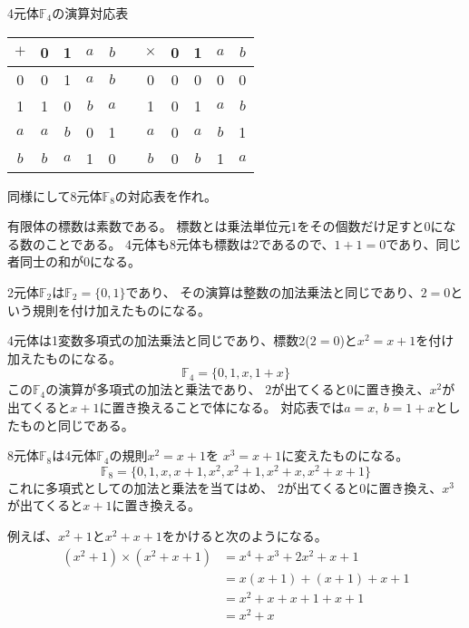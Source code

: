 \documentclass[12pt,b5paper]{ltjsarticle}
\begin{document}
\hrulefill

\begin{center}
 4元体$\mathbb{F}_4$の演算対応表

 \begin{tabular}{c||c|c|c|c||c||c||c|c|c|c}
  $+$ & 0 & 1 & $a$ & $b$ & & $\times$ & 0 & 1 & $a$ & $b$ \\
  \hline\hline
  0 & 0 & 1 & $a$ & $b$ & & 0 & 0 & 0 & 0 & 0 \\
  \hline
  1 & 1 & 0 & $b$ & $a$ & & 1 & 0 & 1 & $a$ & $b$ \\
  \hline
  $a$ & $a$ & $b$ & 0 & 1 & & $a$ & 0 & $a$ & $b$ & 1 \\
  \hline
  $b$ & $b$ & $a$ & 1 & 0 & & $b$ & 0 & $b$ & 1 & $a$ \\
 \end{tabular}
\end{center}

同様にして8元体$\mathbb{F}_8$の対応表を作れ。

\dotfill

有限体の標数は素数である。
標数とは乗法単位元$1$をその個数だけ足すと0になる数のことである。
4元体も8元体も標数は2であるので、$1+1=0$であり、同じ者同士の和が0になる。

2元体$\mathbb{F}_2$は$\mathbb{F}_2=\{0,1\}$であり、
その演算は整数の加法乗法と同じであり、$2=0$という規則を付け加えたものになる。

4元体は1変数多項式の加法乗法と同じであり、標数2($2=0$)と$x^2=x+1$を付け加えたものになる。
\begin{equation}
 \mathbb{F}_4= \{0,1,x,1+x\}
\end{equation}
この$\mathbb{F}_4$の演算が多項式の加法と乗法であり、
$2$が出てくると$0$に置き換え、$x^2$が出てくると$x+1$に置き換えることで体になる。
対応表では$a=x,\ b=1+x$としたものと同じである。

8元体$\mathbb{F}_8$は4元体$\mathbb{F}_4$の規則$x^2=x+1$を
$x^3=x+1$に変えたものになる。
\begin{equation}
 \mathbb{F}_8 = \{ 0,1,x,x+1,x^2,x^2+1,x^2+x,x^2+x+1 \}
\end{equation}
これに多項式としての加法と乗法を当てはめ、
$2$が出てくると$0$に置き換え、$x^3$が出てくると$x+1$に置き換える。

例えば、$x^2+1$と$x^2+x+1$をかけると次のようになる。
\begin{align}
 (x^2+1)\times(x^2+x+1)
 &= x^4+x^3+2x^2+x+1\\
 &= x(x+1) + (x+1) + x+1\\
 &= x^2+x + x+1 + x+1\\
 &= x^2+x
\end{align}
\end{document}

